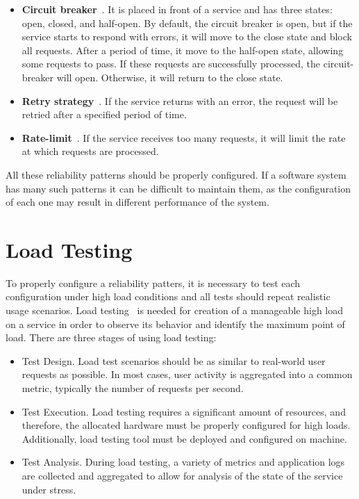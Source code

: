 \begin{itemize}
    \item \textbf{Circuit breaker}~\cite{circuit_breaker_about}. It is placed in front of a service and has three states: open, closed, and half-open. By default, the circuit breaker is open, but if the service starts to respond with errors, it will move to the close state and block all requests. After a period of time, it move to the half-open state, allowing some requests to pass. If these requests are successfully processed, the circuit-breaker will open. Otherwise, it will return to the close state.
    \item \textbf{Retry strategy}~\cite{retry_about}. If the service returns with an error, the request will be retried after a specified period of time.
    \item \textbf{Rate-limit}~\cite{rate_limit_about}. If the service receives too many requests, it will limit the rate at which requests are processed.
\end{itemize}

All these reliability patterns should be properly configured. If a software system has many such patterns it can be difficult to maintain them, as the configuration of each one may result in different performance of the system.


\section{Load Testing}\label{sec:load-testing}
To properly configure a reliability patters, it is necessary to test each configuration under high load conditions and all tests should repeat realistic usage scenarios. Load testing~\cite{load_testing_tips} is needed for creation of a manageable high load on a service in order to observe its behavior and identify the maximum point of load. There are three stages of using load testing:

\begin{itemize}
    \item Test Design. Load test scenarios should be as similar to real-world user requests as possible. In most cases, user activity is aggregated into a common metric, typically the number of requests per second.
    \item Test Execution. Load testing requires a significant amount of resources, and therefore, the allocated hardware must be properly configured for high loads. Additionally, load testing tool must be deployed and configured on machine.
    \item Test Analysis. During load testing, a variety of metrics and application logs are collected and aggregated to allow for analysis of the state of the service under stress.
\end{itemize}

